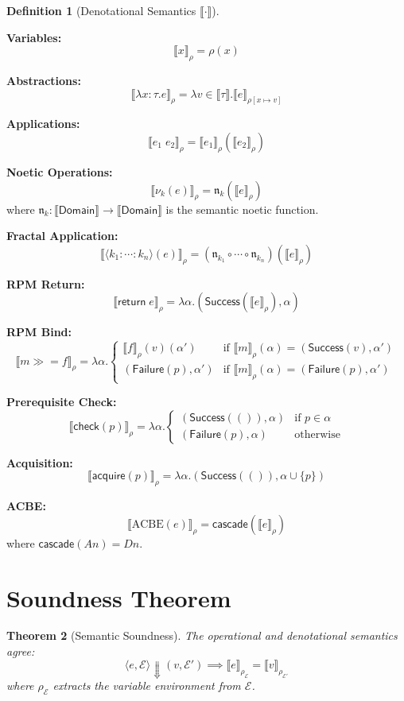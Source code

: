 \documentclass[11pt,twoside,openright]{book}
\theoremstyle{definition}
\newtheorem{definition}{Definition}[chapter]
\theoremstyle{plain}
\newtheorem{theorem}[definition]{Theorem}
\theoremstyle{remark}
\newcommand{\sem}[1]{\llbracket #1 \rrbracket}
\newcommand{\noe}[1]{\nu_{#1}}
\newcommand{\rpmret}{\mathsf{return}}
\newcommand{\rpmbind}{\mathbin{\gg\!=}}
\newcommand{\bigstep}{\Downarrow}
\begin{document}
\begin{definition}[Denotational Semantics $\sem{\cdot}$]
\label{def:denotation-extended}

\textbf{Variables:}
\[
\sem{x}_\rho = \rho(x)
\]

\textbf{Abstractions:}
\[
\sem{\lambda x:\tau. e}_\rho = \lambda v \in \sem{\tau}. \sem{e}_{\rho[x \mapsto v]}
\]

\textbf{Applications:}
\[
\sem{e_1\; e_2}_\rho = \sem{e_1}_\rho(\sem{e_2}_\rho)
\]

\textbf{Noetic Operations:}
\[
\sem{\noe{k}(e)}_\rho = \mathfrak{n}_k(\sem{e}_\rho)
\]
where $\mathfrak{n}_k : \sem{\mathsf{Domain}} \to \sem{\mathsf{Domain}}$ is the semantic noetic function.

\textbf{Fractal Application:}
\[
\sem{\langle k_1 : \cdots : k_n \rangle(e)}_\rho = (\mathfrak{n}_{k_1} \circ \cdots \circ \mathfrak{n}_{k_n})(\sem{e}_\rho)
\]

\textbf{RPM Return:}
\[
\sem{\rpmret\; e}_\rho = \lambda \alpha. (\mathsf{Success}(\sem{e}_\rho), \alpha)
\]

\textbf{RPM Bind:}
\[
\sem{m \rpmbind f}_\rho = \lambda \alpha.
\begin{cases}
\sem{f}_\rho(v)(\alpha') & \text{if } \sem{m}_\rho(\alpha) = (\mathsf{Success}(v), \alpha') \\
(\mathsf{Failure}(p), \alpha') & \text{if } \sem{m}_\rho(\alpha) = (\mathsf{Failure}(p), \alpha')
\end{cases}
\]

\textbf{Prerequisite Check:}
\[
\sem{\mathsf{check}(p)}_\rho = \lambda \alpha.
\begin{cases}
(\mathsf{Success}(()), \alpha) & \text{if } p \in \alpha \\
(\mathsf{Failure}(p), \alpha) & \text{otherwise}
\end{cases}
\]

\textbf{Acquisition:}
\[
\sem{\mathsf{acquire}(p)}_\rho = \lambda \alpha. (\mathsf{Success}(()), \alpha \cup \{p\})
\]

\textbf{ACBE:}
\[
\sem{\mathrm{ACBE}(e)}_\rho = \mathsf{cascade}(\sem{e}_\rho)
\]
where $\mathsf{cascade}(An) = Dn$.
\end{definition}

\section{Soundness Theorem}

\begin{theorem}[Semantic Soundness]
\label{thm:semantic-soundness}
The operational and denotational semantics agree:
\[
\langle e, \mathcal{E} \rangle \bigstep (v, \mathcal{E}') \implies \sem{e}_{\rho_\mathcal{E}} = \sem{v}_{\rho_{\mathcal{E}'}}
\]
where $\rho_\mathcal{E}$ extracts the variable environment from $\mathcal{E}$.
\end{theorem}
\end{document}
